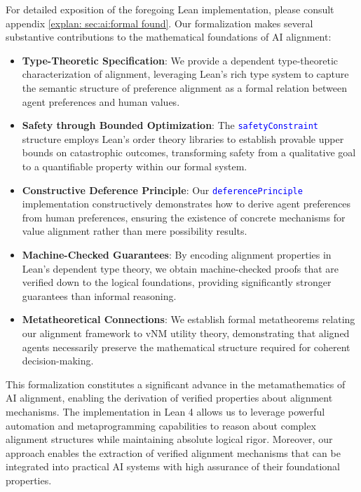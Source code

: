 \documentclass{article}
\theoremstyle{definition}
\newcommand{\tactic}[1]{\textcolor{blue}{\texttt{#1}}}
\begin{document}
For detailed exposition of the foregoing Lean implementation, please consult appendix \ref{explan: sec:ai:formal found}. Our formalization makes several substantive contributions to the mathematical foundations of AI alignment:

\begin{itemize}
  \item \textbf{Type-Theoretic Specification}: We provide a dependent type-theoretic characterization of alignment, leveraging Lean's rich type system to capture the semantic structure of preference alignment as a formal relation between agent preferences and human values.

  \item \textbf{Safety through Bounded Optimization}: The \tactic{safetyConstraint} structure employs Lean's order theory libraries to establish provable upper bounds on catastrophic outcomes, transforming safety from a qualitative goal to a quantifiable property within our formal system.

  \item \textbf{Constructive Deference Principle}: Our \tactic{deferencePrinciple} implementation constructively demonstrates how to derive agent preferences from human preferences, ensuring the existence of concrete mechanisms for value alignment rather than mere possibility results.

  \item \textbf{Machine-Checked Guarantees}: By encoding alignment properties in Lean's dependent type theory, we obtain machine-checked proofs that are verified down to the logical foundations, providing significantly stronger guarantees than informal reasoning.

  \item \textbf{Metatheoretical Connections}: We establish formal metatheorems relating our alignment framework to vNM utility theory, demonstrating that aligned agents necessarily preserve the mathematical structure required for coherent decision-making.
\end{itemize}

This formalization constitutes a significant advance in the metamathematics of AI alignment, enabling the derivation of verified properties about alignment mechanisms. The implementation in Lean 4 allows us to leverage powerful automation and metaprogramming capabilities to reason about complex alignment structures while maintaining absolute logical rigor. Moreover, our approach enables the extraction of verified alignment mechanisms that can be integrated into practical AI systems with high assurance of their foundational properties.
\end{document}
